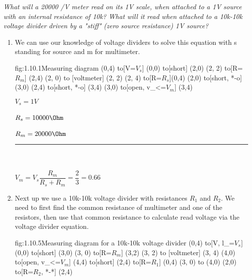 \documentclass{article}
\begin{document}
    \textit{What will a 20000 \Ohm/V meter read on its 1V scale, when attached to a 1V source with an internal resistance of 10k? What will it read when attached to a 10k-10k voltage divider driven by a "stiff" (zero source resistance) 1V source?}

   \begin{enumerate}
       \item
       We can use our knowledge of voltage dividers to solve this equation with s standing for source and m for multimeter.

        \begin{circuit}{fig:1.10.1}{Measuring diagram}
            (0,4) to[V=$V_{s}$] (0,0)
            to[short] (2,0)
            (2, 2) to[R=$R_{m}$] (2,4)
            (2, 0) to [voltmeter] (2, 2)
            (2, 4) to[R=$R_{s}$](0,4)
            (2,0) to[short, *-o] (3,0)
            (2,4) to[short, *-o] (3,4)
            (3,0) to[open, v_<=$V_{m}$] (3,4)
        \end{circuit}

        $V_{s} = 1V$ \\\\
        $R_{s} = 10000 \Ohm$ \\\\
        $R_{m} = 20000 \Ohm$ \\
        \noindent\rule{4cm}{.1pt} \\\\
        $V_{m} = V_{s} \dfrac{R_{m}}{R_{s} + R_{m}} = \dfrac{2}{3} = 0.66$ \\

        \item
        Next up we use a 10k-10k voltage divider with resistances $R_{1}$ and $R_{2}$. We need to first find the common resistance of multimeter and one of the resistors, then use that common resistance to calculate read voltage via the voltage divider equation.


        \begin{circuit}{fig:1.10.5}{Measuring diagram for a 10k-10k voltage divider}
                (0,4) to[V, l_=$V_{s}$] (0,0)
                to[short] (3,0)
                (3, 0) to[R=$R_{m}$] (3,2)
                (3, 2) to [voltmeter] (3, 4)
                (4,0) to[open, v_<=$V_{m}$] (4,4)
                to[short] (2,4)
                to[R=$R_1$] (0,4)
                (3, 0) to (4,0)
                (2,0) to[R=$R_2$, *-*] (2,4)
        \end{circuit}


\end{enumerate}
\end{document}
